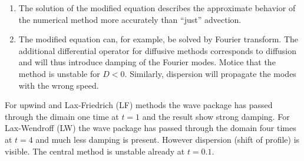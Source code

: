 \begin{remark}
	\begin{enumerate}
		\item The solution of the modified equation describes the approximate behavior of the numerical method more accurately than ``just'' advection.
		\item The modified equation can, for example, be solved by Fourier transform.
		The additional differential operator for diffusive methods corresponds to diffusion and will thus introduce damping of the Fourier modes.
		Motice that the method is unstable for \(D < 0\).
		Similarly, dispersion will propagate the modes with the wrong speed.
	\end{enumerate}
\end{remark}

\begin{example}
	For upwind and Lax-Friedrich (LF) methods the wave package has passed through the dimain one time at \(t = 1\) and the result show strong damping.
	For Lax-Wendroff (LW) the wave package has passed through the domain four times at \(t = 4\) and much less damping is present.
	However dispersion (shift of profile) is visible.
	The central method is unstable already at \(t = 0.1\).
\end{example}
